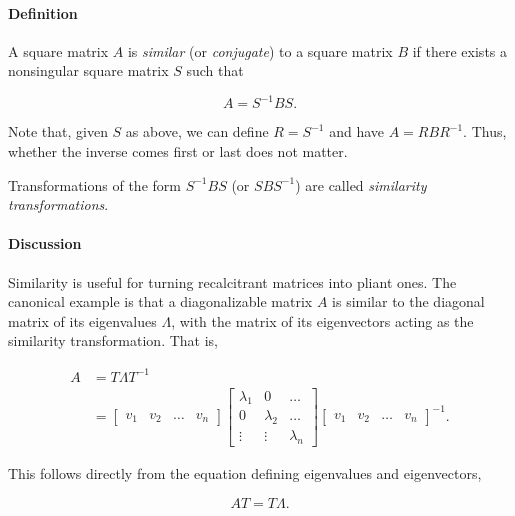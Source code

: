 \documentclass[12pt]{article}
\begin{document}

\paragraph{Definition}
A square matrix $A$ is \emph{similar} (or \emph{conjugate}) to a square matrix $B$ if there exists a nonsingular square matrix $S$ such that

\begin{equation}
A = S^{-1}BS.
\end{equation}

Note that, given $S$ as above, we can define $R=S^{-1}$ and have $A=RBR^{-1}$.  Thus, whether the inverse comes first or last does not matter.

Transformations of the form $S^{-1}BS$ (or $SBS^{-1}$) are called \emph{similarity transformations}.

\paragraph{Discussion}
Similarity is useful for turning recalcitrant matrices into pliant ones.  The canonical example is that a diagonalizable matrix $A$ is similar to the diagonal matrix of its eigenvalues $\Lambda$, with the matrix of its eigenvectors acting as the similarity transformation.  That is,

\begin{align}
A &= T\Lambda T^{-1} \\
&= \left[ \begin{array}{cccc}
v_1 & v_2 & \ldots & v_n
\end{array} \right]
\left[ \begin{array}{ccc}
\lambda_1 & 0 & \ldots \\
0 & \lambda_2 & \ldots \\
\vdots & \vdots & \lambda_n
\end{array} \right]
\left[
\begin{array}{cccc}
v_1 & v_2 & \ldots & v_n
\end{array} \right]^{-1}.
\end{align}

This follows directly from the equation defining eigenvalues and eigenvectors,

\begin{equation}
AT=T\Lambda.
\end{equation}
\end{document}
